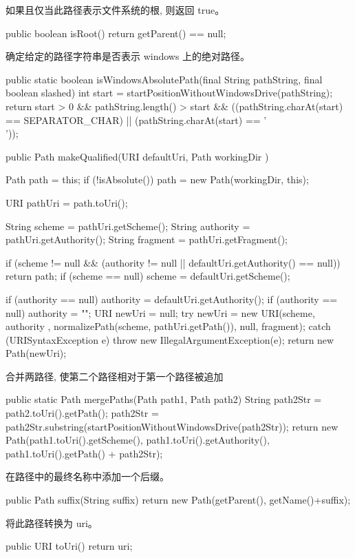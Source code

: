 如果且仅当此路径表示文件系统的根, 则返回 true。
\begin{java}
public boolean isRoot() {
  return getParent() == null;
}
\end{java}
确定给定的路径字符串是否表示 windows 上的绝对路径。
\begin{java}
public static boolean isWindowsAbsolutePath(final String pathString, final boolean slashed) {
  int start = startPositionWithoutWindowsDrive(pathString);
  return start > 0
      && pathString.length() > start
      && ((pathString.charAt(start) == SEPARATOR_CHAR) ||
          (pathString.charAt(start) == '\\'));
}
\end{java}
\begin{java}
public Path makeQualified(URI defaultUri, Path workingDir ) {
  Path path = this;
  if (!isAbsolute()) {
    path = new Path(workingDir, this);
  }

  URI pathUri = path.toUri();

  String scheme = pathUri.getScheme();
  String authority = pathUri.getAuthority();
  String fragment = pathUri.getFragment();

  if (scheme != null &&
      (authority != null || defaultUri.getAuthority() == null))
    return path;
  if (scheme == null) {
    scheme = defaultUri.getScheme();
  }

  if (authority == null) {
    authority = defaultUri.getAuthority();
    if (authority == null) {
      authority = "";
    }
  }
  URI newUri = null;
  try {
    newUri = new URI(scheme, authority ,
      normalizePath(scheme, pathUri.getPath()), null, fragment);
  } catch (URISyntaxException e) {
    throw new IllegalArgumentException(e);
  }
  return new Path(newUri);
}
\end{java}
合并两路径, 使第二个路径相对于第一个路径被追加
\begin{java}
public static Path mergePaths(Path path1, Path path2) {
  String path2Str = path2.toUri().getPath();
  path2Str = path2Str.substring(startPositionWithoutWindowsDrive(path2Str));
  return new Path(path1.toUri().getScheme(),
      path1.toUri().getAuthority(),
      path1.toUri().getPath() + path2Str);
}
\end{java}

在路径中的最终名称中添加一个后缀。

\begin{java}
public Path suffix(String suffix) {
  return new Path(getParent(), getName()+suffix);
}
\end{java}
将此路径转换为 uri。
\begin{java}
public URI toUri() { return uri; }
\end{java}


